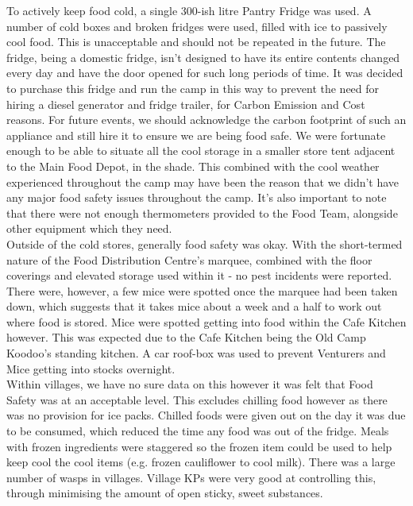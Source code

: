 To actively keep food cold, a single 300-ish litre Pantry Fridge was used. A number of cold boxes and broken fridges were used, filled with ice to passively cool food. This is unacceptable and should not be repeated in the future. The fridge, being a domestic fridge, isn't designed to have its entire contents changed every day and have the door opened for such long periods of time. It was decided to purchase this fridge and run the camp in this way to prevent the need for hiring a diesel generator and fridge trailer, for Carbon Emission and Cost reasons. For future events, we should acknowledge the carbon footprint of such an appliance and still hire it to ensure we are being food safe. We were fortunate enough to be able to situate all the cool storage in a smaller store tent adjacent to the Main Food Depot, in the shade. This combined with the cool weather experienced throughout the camp may have been the reason that we didn't have any major food safety issues throughout the camp. It's also important to note that there were not enough thermometers provided to the Food Team, alongside other equipment which they need. \\

Outside of the cold stores, generally food safety was okay. With the short-termed nature of the Food Distribution Centre's marquee, combined with the floor coverings and elevated storage used within it - no pest incidents were reported. There were, however, a few mice were spotted once the marquee had been taken down, which suggests that it takes mice about a week and a half to work out where food is stored. Mice were spotted getting into food within the Cafe Kitchen however. This was expected due to the Cafe Kitchen being the Old Camp Koodoo's standing kitchen. A car roof-box was used to prevent Venturers and Mice getting into stocks overnight.\\

Within villages, we have no sure data on this however it was felt that Food Safety was at an acceptable level. This excludes chilling food however as there was no provision for ice packs. Chilled foods were given out on the day it was due to be consumed, which reduced the time any food was out of the fridge. Meals with frozen ingredients were staggered so the frozen item could be used to help keep cool the cool items (e.g. frozen cauliflower to cool milk). There was a large number of wasps in villages. Village KPs were very good at controlling this, through minimising the amount of open sticky, sweet substances. \\

